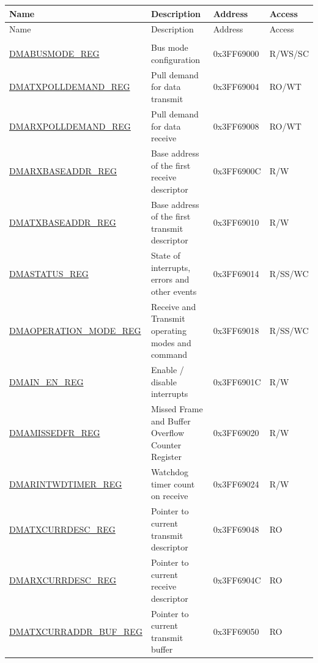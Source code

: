 

\begin{longtable}{ |m{5cm} |m{6cm} | m{2cm} |m{2.2cm} | }
\hline\rowcolor{lightgray}
Name & Description &  Address & Access \\ \hline
\hline
\endfirsthead
\hline
\rowcolor{lightgray}
Name & Description &  Address & Access \\ \hline
\endhead
\hline
\endfoot
\hline
\endlastfoot
\multicolumn{4}{|l|}{\textbf{DMA configuration and control registers}} \\ \hline
\hyperref[regdesc:DMABUSMODEREG]{DMABUSMODE\_REG} & Bus mode configuration & 0x3FF69000 & R/WS/SC \\ \hline
\hyperref[regdesc:DMATXPOLLDEMANDREG]{DMATXPOLLDEMAND\_REG} & Pull demand for data transmit & 0x3FF69004 & RO/WT \\ \hline
\hyperref[regdesc:DMARXPOLLDEMANDREG]{DMARXPOLLDEMAND\_REG} & Pull demand for data receive & 0x3FF69008 & RO/WT \\ \hline
\hyperref[regdesc:DMARXBASEADDRREG]{DMARXBASEADDR\_REG} &  Base address of the first receive descriptor & 0x3FF6900C & R/W \\ \hline
\hyperref[regdesc:DMATXBASEADDRREG]{DMATXBASEADDR\_REG} & Base address of the first transmit descriptor & 0x3FF69010 & R/W \\ \hline
\hyperref[regdesc:DMASTATUSREG]{DMASTATUS\_REG} & State of interrupts, errors and other events & 0x3FF69014 & R/SS/WC \\ \hline
\hyperref[regdesc:DMAOPERATION_MODEREG]{DMAOPERATION\_MODE\_REG} & Receive and Transmit operating modes and command & 0x3FF69018 & R/SS/WC \\ \hline
\hyperref[regdesc:DMAINENREG]{DMAIN\_EN\_REG} & Enable / disable interrupts & 0x3FF6901C & R/W \\ \hline
\hyperref[regdesc:DMAMISSEDFRREG]{DMAMISSEDFR\_REG} & Missed Frame and Buffer Overflow Counter Register & 0x3FF69020 & R/W \\ \hline
\hyperref[regdesc:DMARINTWDTIMERREG]{DMARINTWDTIMER\_REG} & Watchdog timer count on receive & 0x3FF69024 & R/W \\ \hline
\hyperref[regdesc:DMATXCURRDESCREG]{DMATXCURRDESC\_REG} & Pointer to current transmit descriptor & 0x3FF69048 & RO \\ \hline
\hyperref[regdesc:DMARXCURRDESCREG]{DMARXCURRDESC\_REG} & Pointer to current receive descriptor & 0x3FF6904C & RO \\ \hline
\hyperref[regdesc:DMATXCURRADDRBUFREG]{DMATXCURRADDR\_BUF\_REG} & Pointer to current transmit buffer & 0x3FF69050 & RO \\ \hline

\end{longtable}
